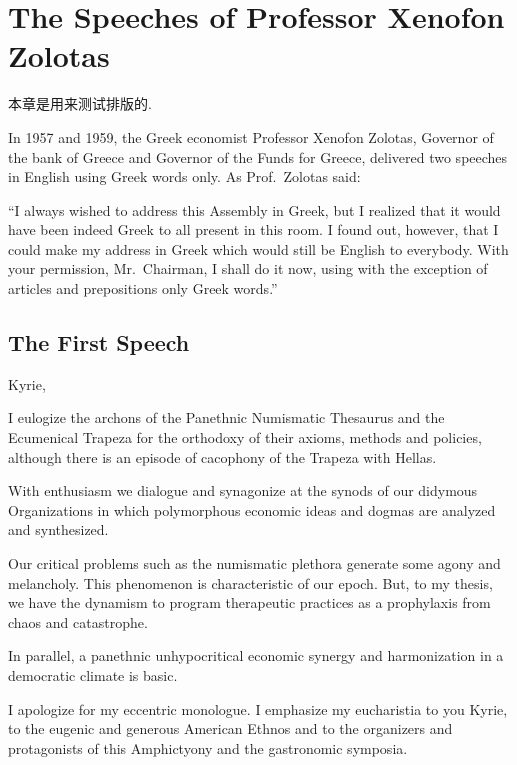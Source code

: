 \chapter{The Speeches of Professor Xenofon Zolotas}

\begin{remark*}
    本章是用来测试排版的.
\end{remark*}

\begin{remark*}
    In 1957 and 1959, the Greek economist Professor Xenofon
    Zolotas, Governor of the bank of Greece and Governor of the
    Funds for Greece, delivered two speeches in English using
    Greek words only. As Prof.~Zolotas said:

    ``I always wished to address this Assembly in Greek, but I
    realized that it would have been indeed Greek to all present
    in this room. I found out, however, that I could make my
    address in Greek which would still be English to everybody.
    With your permission, Mr.~Chairman, I shall do it now, using
    with the exception of articles and prepositions only Greek
    words.''
\end{remark*}

\section{The First Speech}

Kyrie,

I eulogize the archons of the Panethnic Numismatic Thesaurus and
the Ecumenical Trapeza for the orthodoxy of their axioms, methods
and policies, although there is an episode of cacophony of the
Trapeza with Hellas.

With enthusiasm we dialogue and synagonize at the synods of our
didymous Organizations in which polymorphous economic ideas and
dogmas are analyzed and synthesized.

Our critical problems such as the numismatic plethora generate
some agony and melancholy. This phenomenon is characteristic of
our epoch. But, to my thesis, we have the dynamism to program
therapeutic practices as a prophylaxis from chaos and catastrophe.

In parallel, a panethnic unhypocritical economic synergy and
harmonization in a democratic climate is basic.

I apologize for my eccentric monologue. I emphasize my eucharistia
to you Kyrie, to the eugenic and generous American Ethnos and to
the organizers and protagonists of this Amphictyony and the
gastronomic symposia.

